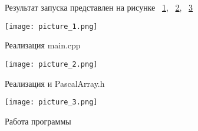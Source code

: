 \documentclass[a4paper, 14pt]{extarticle}
\begin{document}
\begin{figure}[!htb]
Результат запуска представлен на рисунке ~\ref{fig:picture_1.png}, ~\ref{fig:picture_2.png}, ~\ref{fig:picture_3.png}
\end{figure}

\begin{figure}[!htb]
	\centering
	\texttt{[image: picture\_1.png]}
\caption{Реализация main.cpp}
\label{fig:picture_1.png}
\end{figure}

\begin{figure}[!htb]
	\centering
	\texttt{[image: picture\_2.png]}
\caption{Реализация и PascalArray.h}
\label{fig:picture_2.png}
\end{figure}

\begin{figure}[!htb]
	\centering
	\texttt{[image: picture\_3.png]}
\caption{Работа программы}
\label{fig:picture_3.png}
\end{figure}
\end{document}
